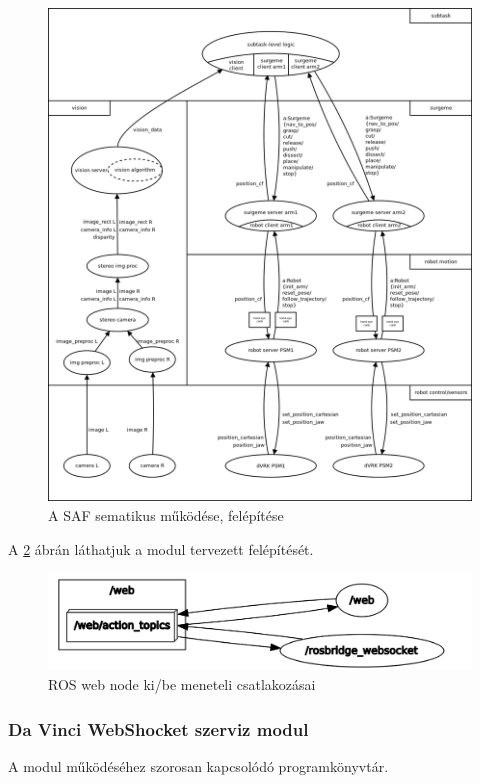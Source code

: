 \documentclass[12pt,a4paper,oneside]{report} %
\begin{document}
\begin{figure}[H]
	\label{fig:irob}
	\begin{center}
		\includegraphics[width=14cm]{irobArch}
		\caption{A SAF sematikus működése, felépítése \cite{Abc-irobotics2020May} }
	\end{center}
\end{figure}
A \ref{fig:irob_web} ábrán láthatjuk a modul tervezett felépítését.
\begin{figure}[H]
	\centering
	\label{fig:irob_web}
	\includegraphics[width=14cm]{irob_web}
	\caption{ROS web node ki/be meneteli csatlakozásai}
\end{figure}


\subsubsection{Da Vinci WebShocket szerviz modul}
A modul működéséhez szorosan kapcsolódó programkönyvtár.
\end{document}
